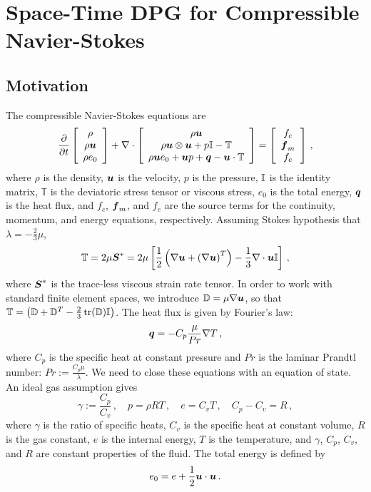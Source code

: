 \documentclass[Dissertation.tex]{subfiles}
\begin{document}
\graphicspath{{../Figures/}}
\chapter{Space-Time DPG for Compressible Navier-Stokes}
\label{sec:compressible}
\section{Motivation}

The compressible Navier-Stokes equations are
\begin{align}
\frac{\partial}{\partial t}\left[ \begin{array}{c} \rho\\ \rho\boldsymbol u\\ \rho e_0\\ \end{array} \right]
+\nabla\cdot\left[ \begin{array}{c} \rho\boldsymbol u\\ \rho\boldsymbol u\otimes\boldsymbol u+p\mathbb{I}-\mathbb{T}\\ \rho\boldsymbol u e_0+\boldsymbol u p+\boldsymbol q-\boldsymbol u\cdot\mathbb{T}\\ \end{array} \right]
=\left[ \begin{array}{c} f_c\\ \boldsymbol f_m\\ f_e\\ \end{array} \right]\,,
\end{align}
where $\rho$ is the density, $\boldsymbol u$ is the velocity, $p$ is the pressure, $\mathbb{I}$ is the identity matrix,
$\mathbb{T}$ is the deviatoric stress tensor or viscous stress, $e_0$ is the total energy, $\boldsymbol q$ is the heat flux, 
and $f_c$, $\boldsymbol f_m$, and $f_e$ are the source terms for the continuity, momentum, and energy equations, respectively.
Assuming Stokes hypothesis that $\lambda=-\frac{2}{3}\mu$, 
\begin{equation*}
	\mathbb{T}=2\mu\boldsymbol S^*=2\mu\left[ \frac{1}{2}\left( \nabla\boldsymbol u+\left( \nabla\boldsymbol u \right)^T \right)-\frac{1}{3}\nabla\cdot\boldsymbol u\mathbb{I} \right]\,,
\end{equation*}
where $\boldsymbol S^*$ is the trace-less viscous strain rate tensor.
In order to work with standard finite element spaces, we introduce $\mathbb{D}=\mu\nabla\boldsymbol u$, so that 
$\mathbb{T}=\left( \mathbb{D}+\mathbb{D}^T-\frac{2}{3}\operatorname*{tr}(\mathbb{D})\mathbb{I} \right)$.
The heat flux is given by Fourier's law:
\begin{equation*}
	\boldsymbol q=-C_p\frac{\mu}{Pr}\nabla T\,,
\end{equation*}
where $C_p$ is the specific heat at constant pressure and $Pr$ is the laminar Prandtl number: $Pr:=\frac{C_p\mu}{\lambda}$.
We need to close these equations with an equation of state. An ideal gas assumption gives
\begin{equation*}
	\gamma:=\frac{C_p}{C_v}\,,\quad p=\rho RT\,,\quad e=C_v T\,,\quad C_p-C_v=R\,,
\end{equation*}
where $\gamma$ is the ratio of specific heats, $C_v$ is the specific heat at constant volume, $R$ is the gas constant,
$e$ is the internal energy, $T$ is the temperature,
and $\gamma$, $C_p$, $C_v$, and $R$ are constant properties of the fluid.
The total energy is defined by
\begin{equation*}
	e_0=e+\frac{1}{2}\boldsymbol u\cdot\boldsymbol u\,.
\end{equation*}
\end{document}
